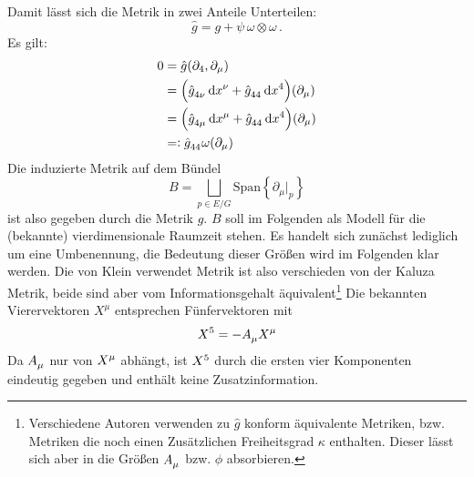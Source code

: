 Damit lässt sich die Metrik in zwei Anteile Unterteilen:
\begin{equation}
\hat{g}=g+\psi\,\omega\otimes\omega\,.
\end{equation}
Es gilt:
\begin{equation}
\begin{split}
0&=\hat{g}(\partial_4,\partial_\mu)\\
&=\left(\tensor{\hat{g}}{_4_\nu}\dif\tensor{x}{^\nu}
+\tensor{\hat{g}}{_4_4}\dif\tensor{x}{^4}\right)(\partial_\mu)\\
&=\left(\tensor{\hat{g}}{_4_\mu}\dif\tensor{x}{^\mu}
+\tensor{\hat{g}}{_4_4}\dif\tensor{x}{^4}\right)(\partial_\mu)\\
&=: \tensor{\hat{g}}{_4_4}\omega(\partial_\mu)
\end{split}
\end{equation}
Die induzierte Metrik auf dem Bündel 
\begin{equation}
B=\bigsqcup_{p\in E/G}\mathrm{Span}\left\{\partial_\mu|_p\right\}
\end{equation}
ist also gegeben durch die Metrik $g$. $B$ soll im Folgenden als Modell für die
(bekannte) vierdimensionale Raumzeit stehen.
Es handelt sich zunächst lediglich
um eine Umbenennung, die Bedeutung dieser Größen wird im Folgenden klar werden. Die von Klein verwendet Metrik ist also verschieden von der Kaluza
Metrik, beide sind aber vom Informationsgehalt äquivalent\footnote{Verschiedene
Autoren verwenden zu $\hat{g}$ konform äquivalente Metriken, 
bzw. Metriken die noch einen Zusätzlichen Freiheitsgrad $\kappa$ enthalten.
Dieser lässt sich aber in die Größen $\tensor{A}{_\mu}$ bzw. $\phi$ absorbieren.}
Die bekannten Vierervektoren $X^\mu$ entsprechen Fünfervektoren mit
\begin{equation}
\tensor{X}{^5}=-\tensor{A}{_\mu}\tensor{X}{^\mu}
\end{equation}
Da $\tensor{A}{_\mu}$ nur von $\tensor{X}{^\mu}$ abhängt, ist $\tensor{X}{^5}$
durch die ersten vier Komponenten eindeutig gegeben und enthält keine
Zusatzinformation.
